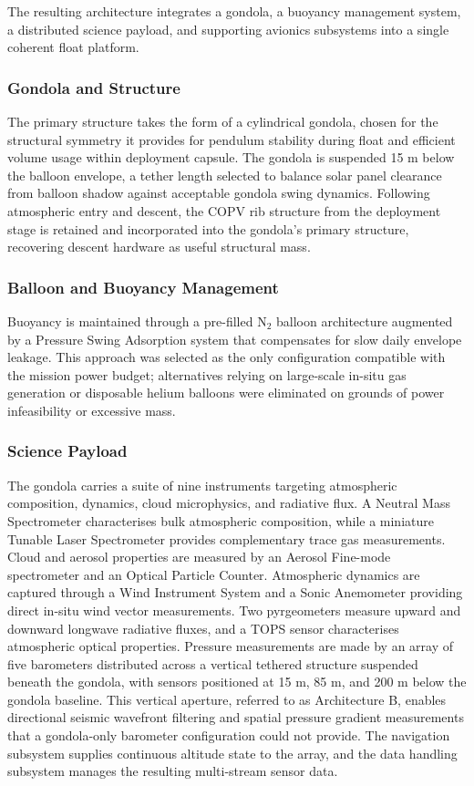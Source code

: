 The resulting architecture integrates a gondola, a buoyancy management system, a distributed science payload, and supporting avionics subsystems into a single coherent float platform.

\subsubsection*{Gondola and Structure}
The primary structure takes the form of a cylindrical gondola, chosen for the structural symmetry it provides for pendulum stability during float and efficient volume usage within deployment capsule. The gondola is suspended 15 m below the balloon envelope, a tether length selected to balance solar panel clearance from balloon shadow against acceptable gondola swing dynamics. Following atmospheric entry and descent, the COPV rib structure from the deployment stage is retained and incorporated into the gondola's primary structure, recovering descent hardware as useful structural mass.

\subsubsection*{Balloon and Buoyancy Management}
Buoyancy is maintained through a pre-filled N$_2$ balloon architecture augmented by a Pressure Swing Adsorption system that compensates for slow daily envelope leakage. This approach was selected as the only configuration compatible with the mission power budget; alternatives relying on large-scale in-situ gas generation or disposable helium balloons were eliminated on grounds of power infeasibility or excessive mass.

\subsubsection*{Science Payload}
The gondola carries a suite of nine instruments targeting atmospheric composition, dynamics, cloud microphysics, and radiative flux. A Neutral Mass Spectrometer characterises bulk atmospheric composition, while a miniature Tunable Laser Spectrometer provides complementary trace gas measurements. Cloud and aerosol properties are measured by an Aerosol Fine-mode spectrometer and an Optical Particle Counter. Atmospheric dynamics are captured through a Wind Instrument System and a Sonic Anemometer providing direct in-situ wind vector measurements. Two pyrgeometers measure upward and downward longwave radiative fluxes, and a TOPS sensor characterises atmospheric optical properties.
Pressure measurements are made by an array of five barometers distributed across a vertical tethered structure suspended beneath the gondola, with sensors positioned at 15 m, 85 m, and 200 m below the gondola baseline. This vertical aperture, referred to as Architecture B, enables directional seismic wavefront filtering and spatial pressure gradient measurements that a gondola-only barometer configuration could not provide. The navigation subsystem supplies continuous altitude state to the array, and the data handling subsystem manages the resulting multi-stream sensor data.

